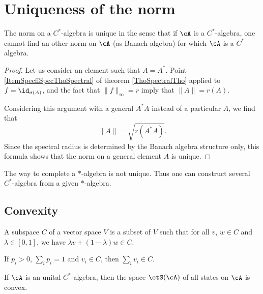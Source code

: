\section{Uniqueness of the norm}

\begin{proposition}         \label{prop:unicitenormcsa}
The norm on a $C^*$-algebra is unique in the sense that if $\cA$ is a $C^*$-algebra, one cannot find an other norm on $\cA$ (as Banach algebra) for which $\cA$ is a $C^*$-algebra.
\end{proposition}

\begin{proof}
    Let us consider an element such that $A=A^*$. Point \ref{ItemSpecffSpecThoSpectral} of theorem \ref{ThoSpectralTho} applied to $f=\id_{\sigma(A)}$, and the fact that $\| f \|_{\infty}=r$ imply that $\| A \|=r(A)$. 

    Considering this argument with a general $A^*A$ instead of a particular $A$, we find that
    \begin{equation}
    \| A \|=\sqrt{r(A^*A)}.
    \end{equation}
    Since the spectral radius is determined by the Banach algebra structure only, this formula shows that the norm on a general element $A$ is unique.

\end{proof}

\begin{remark}
The way to complete a $*$-algebra is not unique. Thus one can construct several $C^*$-algebra from a given $*$-algebra.
\end{remark}

\subsection{Convexity}

A  subspace $C$ of a vector space $V$ is a subset of $V$ such that for all $v$, $w\in C$ and $\lambda\in[0,1]$, we have $\lambda v+(1-\lambda)w\in C$.

If $p_i>0$, $\sum_ip_i=1$ and $v_i\in C$, then $\sum_i v_i\in C$.

\begin{lemma}
If $\cA$ is an unital $C^*$-algebra, then the space $\etS(\cA)$ of all states on $\cA$ is convex.
\end{lemma}

